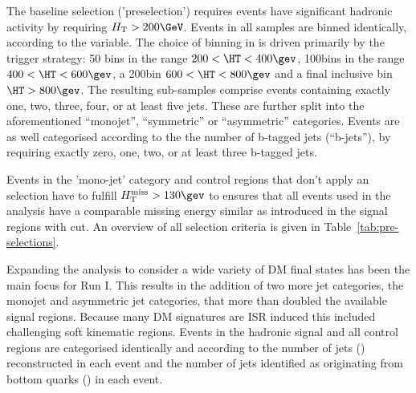 The baseline selection ('preselection') requires events have significant hadronic activity by requiring $\scalht > 200\GeV$.  Events in all samples are binned identically, according to the \HT variable. The choice of binning in \HT is driven primarily by the trigger strategy: 50\gev
bins in the range $200 < \HT < 400\gev$, 100\gev bins in the range $400 < \HT < 600\gev$, a 200\gev bin $600<\HT<800\gev$ and a final 
inclusive bin $\HT > 800\gev$. The resulting sub-samples comprise events containing exactly one, two, three, four, or at least five jets. These are further split into the aforementioned  ``monojet'',  ``symmetric'' or ``asymmetric'' \njet categories. Events are as well categorised according to the the number of b-tagged jets (``b-jets''), by requiring exactly zero, one, two, or at least three b-tagged jets. 


Events in the 'mono-jet' category and control regions that don't apply an \alphat selection have to fulfill $\mht>130\gev$ to ensures that all events used in the analysis have a comparable missing energy similar as introduced in the signal regions with \alphat cut. An overview of all selection criteria is given in Table~\ref{tab:pre-selections}.


Expanding the analysis to consider a wide variety of DM final states has been the main focus for Run I. This results in the addition of two more jet categories, the monojet and asymmetric jet categories, that more than doubled the available signal regions. Because many DM signatures are ISR induced this included challenging soft kinematic regions. Events in the hadronic signal and all control regions are categorised identically and according to the number of jets (\njet) reconstructed in each event and the number of jets identified as originating from bottom quarks (\nb) in each event. 


